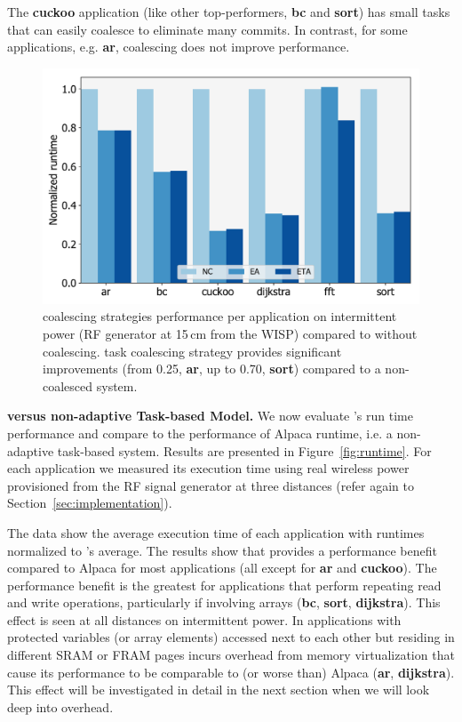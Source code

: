 The \textbf{cuckoo} application (like other top-performers, \textbf{bc} and \textbf{sort}) has small tasks that \sys can easily coalesce to eliminate many commits. In contrast, for some applications, e.g. \textbf{ar}, coalescing does not improve performance. 


\begin{figure}
	\centering
	\includegraphics[width=0.5\columnwidth]{figures/coalStrategies}
	\caption{\sys coalescing strategies performance per application on intermittent power (RF generator at 15\,cm from the WISP) compared to \sys without coalescing. \sys task coalescing strategy provides significant improvements (from 0.25, \textbf{ar}, up to 0.70, \textbf{sort}) compared to a non-coalesced system.}
	\label{fig:coalescing}
\end{figure}

\textbf{\sys versus non-adaptive Task-based Model.} We now evaluate \sys's run time performance and compare \sys to the performance of Alpaca runtime, i.e. a non-adaptive task-based system. Results are presented in Figure~\ref{fig:runtime}. For each application we measured its execution time using real wireless power provisioned from the RF signal generator at three distances (refer again to Section~\ref{sec:implementation}).

The data show the average execution time of each application with runtimes normalized to \sys's average.  The results show that \sys provides a performance benefit compared to Alpaca for most applications (all except for \textbf{ar} and \textbf{cuckoo}). The performance benefit is the greatest for applications that perform repeating read and write operations, particularly if involving arrays (\textbf{bc}, \textbf{sort}, \textbf{dijkstra}). This effect is seen at all distances on intermittent power. In applications with protected variables (or array elements) accessed next to each other but residing in different SRAM or FRAM pages \sys incurs overhead from memory virtualization that cause its performance to be comparable to (or worse than) Alpaca (\textbf{ar}, \textbf{dijkstra}). This effect will be investigated in detail in the next section when we will look deep into \sys overhead. 

